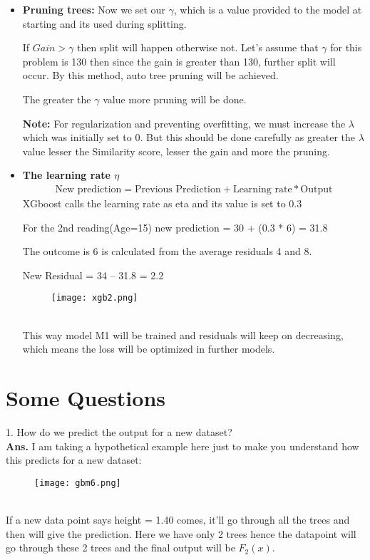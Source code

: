 \documentclass[a4paper, 11pt]{article}
\begin{document}
\begin{itemize}
          \item \textbf{Pruning trees: }
          Now we set our $\gamma$, which is a value provided to the model at starting and its used during splitting.
          
          If $Gain >\gamma $ then split will happen otherwise not. Let’s assume that $\gamma$ for this problem is 130 then since the gain is greater than 130, further split will occur. By this method, auto tree pruning will be achieved. 
          
          The greater the $\gamma$ value more pruning will be done.
        
         \textbf{Note: } For regularization and preventing overfitting, we must increase the $\lambda$  which was initially set to 0. But this should be done carefully as greater the $\lambda$  value lesser the Similarity score, lesser the gain and more the pruning.
          \item \textbf{The learning rate $\eta$}
          \begin{align}
            \text{New prediction} = \text{Previous Prediction} + \text{Learning rate} * \text{Output}
          \end{align}
          XGboost calls the learning rate as eta and its value is set to 0.3 

For the 2nd reading(Age=15) new prediction = 30 + (0.3 * 6) = 31.8

The outcome is 6 is calculated from the average residuals 4 and 8.

New Residual = 34 – 31.8 = 2.2
\begin{figure}[h!]
    \centering
    \texttt{[image: xgb2.png]}
    \label{fig:fig2}
  \end{figure}\\
  This way model M1 will be trained and residuals will keep on decreasing, which means the loss will be optimized in further models.
    \end{itemize} 



\section{Some Questions}
1. How do we predict the output for a new dataset?\\
\textbf{Ans.}  I am taking a hypothetical example here just to
make you understand how this predicts for a new dataset:
\begin{figure}[h!]
    \centering
    \texttt{[image: gbm6.png]}
    \label{fig:fig6}
  \end{figure}\\
  If a new data point says height = 1.40 comes, it’ll go through all the trees and then will give the prediction. Here we have only 2 trees hence the datapoint will go through these 2 trees and the final output will be $F_2(x).$ \\
\end{document}
